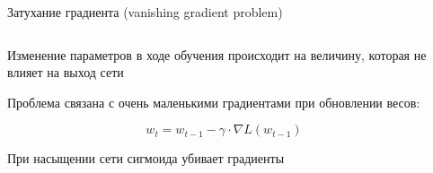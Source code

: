 \documentclass[notes,12pt, aspectratio=169]{beamer}
\newenvironment{wideitemize}{\itemize\addtolength{\itemsep}{10pt}}{\enditemize}
\begin{document}
\begin{frame}{Затухание градиента (vanishing gradient problem)}
\begin{columns}
	\begin{column}{0.45\textwidth}
		\begin{wideitemize}
			\item  Изменение параметров в ходе обучения происходит на величину, которая  не влияет на выход сети
			
			\item Проблема связана с очень маленькими градиентами при обновлении весов:
			
			$$
			w_t = w_{t-1} - \gamma \cdot \nabla L(w_{t-1})
			$$
			
			\item При насыщении сети сигмоида убивает градиенты
		\end{wideitemize}
	\end{column}
	\hfill
	\begin{column}{0.55\textwidth}
		
		\begin{center}
			
		\end{center} 
	\end{column}
\end{columns}
\end{frame}
\end{document}
